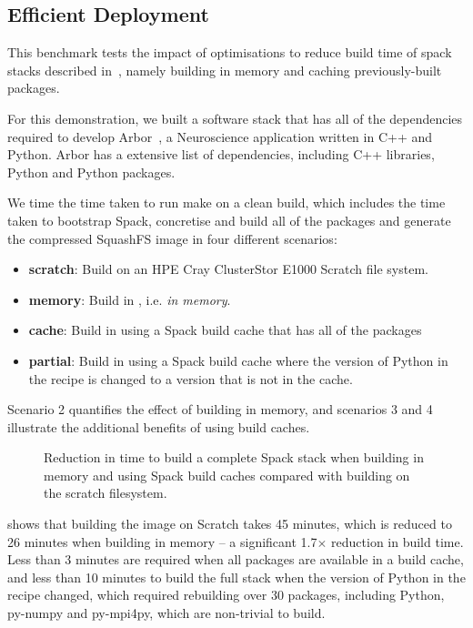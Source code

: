 \subsection{Efficient Deployment}
\label{sec:efficient-deployment}

This benchmark tests the impact of optimisations to reduce build time of spack stacks described in~, namely building in memory and caching previously-built packages.

For this demonstration, we built a software stack that has all of the dependencies required to develop Arbor~\cite{paper:arbor2019,software:arbor}, a Neuroscience application written in C++ and Python.
Arbor has a extensive list of dependencies, including C++ libraries, Python and Python packages.

We time the time taken to run make on a clean build, which includes the time taken to bootstrap Spack, concretise and build all of the packages and generate the compressed SquashFS image in four different scenarios:
\begin{itemize}
    \item \textbf{scratch}: Build on an HPE Cray ClusterStor E1000 Scratch file system.
    \item \textbf{memory}: Build in , i.e. \emph{in memory}.
    \item \textbf{cache}: Build in  using a Spack build cache that has all of the packages 
    \item \textbf{partial}: Build in  using a Spack build cache where the version of Python in the recipe is changed to a version that is not in the cache.
\end{itemize}
Scenario 2 quantifies the effect of building in memory, and scenarios 3 and 4 illustrate the additional benefits of using build caches.

\begin{figure}[htp!]
    \begin{center}
        
    \end{center}
    \caption{Reduction in time to build a complete Spack stack when building in memory and using Spack build caches compared with building on the scratch filesystem.}
    \label{fig:image-build}
\end{figure}

 shows that building the image on Scratch takes 45 minutes, which is reduced to 26 minutes when building in memory -- a significant 1.7$\times$ reduction in build time.
Less than 3 minutes are required when all packages are available in a build cache, and less than 10 minutes to build the full stack when the version of Python in the recipe changed, which required rebuilding over 30 packages, including Python, py-numpy and py-mpi4py, which are non-trivial to build.

